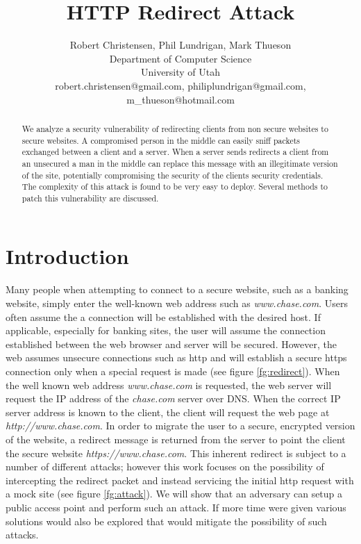 \documentclass{article}
\title{HTTP Redirect Attack}
\author{Robert Christensen, Phil Lundrigan, Mark Thueson\\
Department of Computer Science\\
University of Utah \\
robert.christensen@gmail.com, philiplundrigan@gmail.com, m\_thueson@hotmail.com}
\begin{document}
\maketitle

\begin{abstract}
We analyze a security vulnerability of redirecting clients from non secure
websites to secure websites.  A compromised person in the middle can easily
sniff packets exchanged between a client and a server.  When a server sends
redirects a client from an unsecured a man in the middle can replace this
message with an illegitimate version of the site, potentially compromising
the security of the clients security credentials.  The complexity of this
attack is found to be very easy to deploy.  Several methods to patch
this vulnerability are discussed.

\end{abstract}

\section{Introduction}
Many people when attempting to connect to a secure website, such as a banking website, simply enter the well-known web address such as {\em www.chase.com}. Users often assume the a connection will be established with the desired host.  If applicable, especially for banking sites, the user will assume the connection established between the web browser and server will be secured.  However, the web assumes unsecure connections such as http and will establish a secure https connection only when a special request is made (see figure \ref{fg:redirect}).  When the well known web address {\em www.chase.com} is requested, the web server will request the IP address of the {\em chase.com} server over DNS.  When the correct IP server address is known to the client, the client will request the web page at {\em http://www.chase.com}.  In order to migrate the user to a secure, encrypted version of the website, a redirect message is returned from the server to point the client the secure website {\em https://www.chase.com}.  This inherent redirect is subject to a number of different attacks; however this work focuses on the possibility of intercepting the redirect packet and instead servicing the initial http request with a mock site \cite{offpath} (see figure \ref{fg:attack}).  We will show that an adversary can setup a public access point and perform such an attack.  If more time were given various solutions would also be explored that would mitigate the possibility of such attacks.
\end{document}
